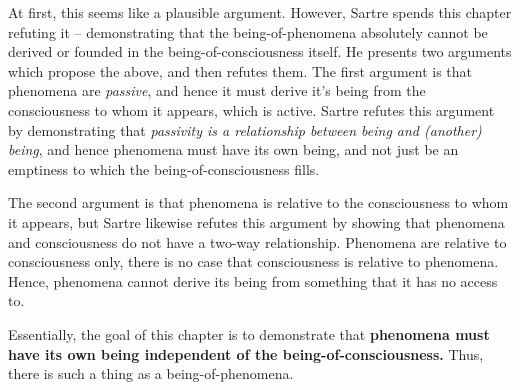 At first, this seems like a plausible argument. However, Sartre spends this chapter refuting it -- demonstrating that the being-of-phenomena absolutely cannot be derived or founded in the being-of-consciousness itself. He presents two arguments which propose the above, and then refutes them. The first argument is that phenomena are \emph{passive}, and hence it must derive it's being from the consciousness to whom it appears, which is active. Sartre refutes this argument by demonstrating that \emph{passivity is a relationship between being and (another) being}, and hence phenomena must have its own being, and not just be an emptiness to which the being-of-consciousness fills. 

The second argument is that phenomena is relative to the consciousness to whom it appears, but Sartre likewise refutes this argument by showing that phenomena and consciousness do not have a two-way relationship. Phenomena are relative to consciousness only, there is no case that consciousness is relative to phenomena. Hence, phenomena cannot derive its being from something that it has no access to.

Essentially, the goal of this chapter is to demonstrate that \textbf{phenomena must have its own being independent of the being-of-consciousness.} Thus, there is such a thing as a being-of-phenomena.

